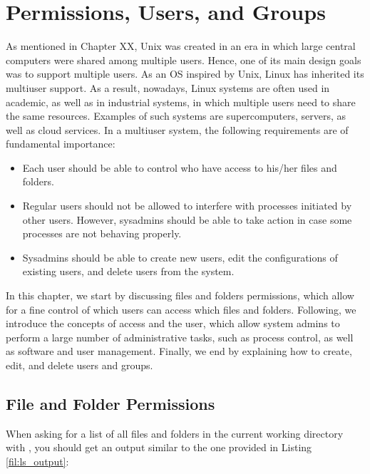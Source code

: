 \chapter{Permissions, Users, and Groups}\label{ch:users_groups}

As mentioned in Chapter XX, Unix was created in an era in which large central computers were shared among multiple users. Hence, one of its main design goals was to support multiple users. As an \ac{OS} inspired by Unix, Linux has inherited its multiuser support. As a result, nowadays, Linux systems are often used in academic, as well as in industrial systems, in which multiple users need to share the same resources. Examples of such systems are supercomputers, servers, as well as cloud services. In a multiuser system, the following requirements are of fundamental importance: 

\begin{itemize}
\item Each user should be able to control who have access to his/her files and folders.
\item Regular users should not be allowed to interfere with processes initiated by other users. However, sysadmins should be able to take action in case some processes are not behaving properly.
\item Sysadmins should be able to create new users, edit the configurations of existing users, and delete users from the system.
\end{itemize}

In this chapter, we start by discussing files and folders permissions, which allow for a fine control of which users can access which files and folders. Following, we introduce the concepts of  access and the  user, which allow system admins to perform a large number of administrative tasks, such as process control, as well as software and user management. Finally, we end by explaining how to create, edit, and delete users and groups.


\section{File and Folder Permissions}

When asking for a list of all files and folders in the current working directory with , you should get an output similar to the one provided in Listing \ref{fil:ls_output}:

